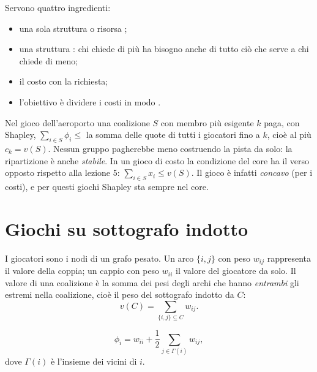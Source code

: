 \begin{osservazione}
Servono quattro ingredienti:
\begin{itemize}
  \item una sola struttura o risorsa ;
  \item una struttura : chi chiede di più ha bisogno anche di tutto ciò che
        serve a chi chiede di meno;
  \item il costo  con la richiesta;
  \item l'obiettivo è dividere i costi in modo .
\end{itemize}
\end{osservazione}

\begin{extra}
Nel gioco dell'aeroporto una coalizione $S$ con membro più esigente $k$ paga, con Shapley,
$\sum_{i \in S} \phi_i \le$ la somma delle quote di tutti i giocatori fino a $k$, cioè al
più $c_k = v(S)$. Nessun gruppo pagherebbe meno costruendo la pista da solo: la ripartizione
è anche \emph{stabile}. In un gioco di costo la condizione del core ha il verso opposto
rispetto alla lezione 5: $\sum_{i\in S} x_i \le v(S)$. Il gioco è infatti \emph{concavo}
(per i costi), e per questi giochi Shapley sta sempre nel core.
\end{extra}

\section{Giochi su sottografo indotto}
\label{sec:isg}

\begin{definizione}
I giocatori sono i nodi di un grafo pesato. Un arco $\{i,j\}$ con peso $w_{ij}$ rappresenta
il valore della coppia; un cappio con peso $w_{ii}$ il valore del giocatore da solo. Il
valore di una coalizione è la somma dei pesi degli archi che hanno \emph{entrambi} gli
estremi nella coalizione, cioè il peso del sottografo indotto da $C$:
\[
  v(C) = \sum_{\{i,j\} \subseteq C} w_{ij}.
\]
\end{definizione}

\begin{teorema}
\[
  \phi_i = w_{ii} + \frac12 \sum_{j \in \Gamma(i)} w_{ij},
\]
dove $\Gamma(i)$ è l'insieme dei vicini di $i$.
\end{teorema}

